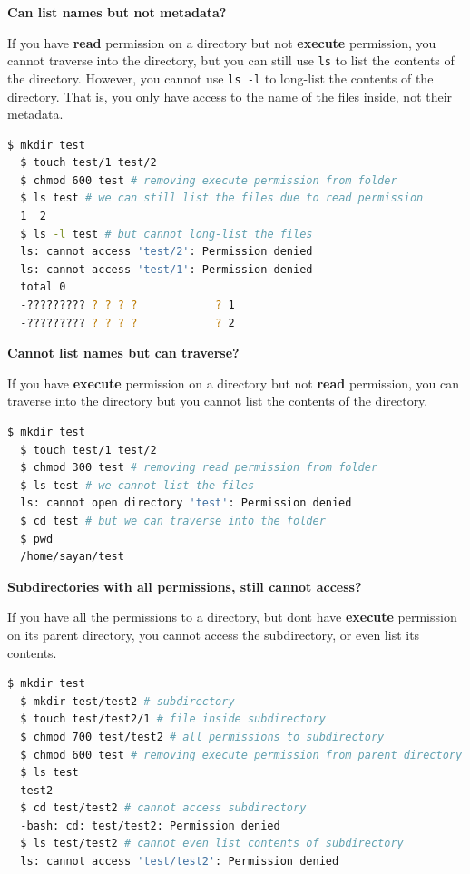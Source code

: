 \textbf{Can list names but not metadata?}

If you have \textbf{read} permission on a directory but not \textbf{execute} permission, you cannot traverse into the directory, but you can still use \texttt{ls} to list the contents of the directory.
However, you cannot use \texttt{ls -l} to long-list the contents of the directory.
That is, you only have access to the name of the files inside, not their metadata.

\begin{lstlisting}[language=bash]
  $ mkdir test
  $ touch test/1 test/2
  $ chmod 600 test # removing execute permission from folder
  $ ls test # we can still list the files due to read permission
  1  2
  $ ls -l test # but cannot long-list the files
  ls: cannot access 'test/2': Permission denied
  ls: cannot access 'test/1': Permission denied
  total 0
  -????????? ? ? ? ?            ? 1
  -????????? ? ? ? ?            ? 2
\end{lstlisting}

\textbf{Cannot list names but can traverse?}

If you have \textbf{execute} permission on a directory but not \textbf{read} permission, you can traverse into the directory but you cannot list the contents of the directory.

\begin{lstlisting}[language=bash]
  $ mkdir test
  $ touch test/1 test/2
  $ chmod 300 test # removing read permission from folder
  $ ls test # we cannot list the files
  ls: cannot open directory 'test': Permission denied
  $ cd test # but we can traverse into the folder
  $ pwd
  /home/sayan/test
\end{lstlisting}

\textbf{Subdirectories with all permissions, still cannot access?}

If you have all the permissions to a directory, but dont have
\textbf{execute} permission on its parent directory,
you cannot access the subdirectory, or even list its contents.

\begin{lstlisting}[language=bash]
  $ mkdir test
  $ mkdir test/test2 # subdirectory
  $ touch test/test2/1 # file inside subdirectory
  $ chmod 700 test/test2 # all permissions to subdirectory
  $ chmod 600 test # removing execute permission from parent directory
  $ ls test
  test2
  $ cd test/test2 # cannot access subdirectory
  -bash: cd: test/test2: Permission denied
  $ ls test/test2 # cannot even list contents of subdirectory
  ls: cannot access 'test/test2': Permission denied
\end{lstlisting}

